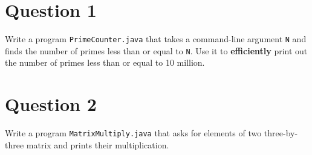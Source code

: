 \section*{Question 1}
Write a program \texttt{PrimeCounter.java} that takes a command-line argument \texttt{N} and finds the number of primes less than or equal to \texttt{N}. Use it to \textbf{efficiently} print out the number of primes less than or equal to 10 million.

\section*{Question 2}
Write a program \texttt{MatrixMultiply.java} that asks for elements of two three-by-three matrix and prints their multiplication.